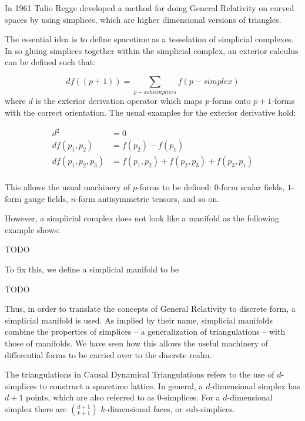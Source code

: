 \documentclass[12pt]{article}
\begin{document}
In 1961 Tulio Regge developed a method for doing General Relativity on curved spaces by using simplices, which are higher dimensional versions of triangles. \cite{regge}

The essential idea is to define spacetime as a tesselation of simplicial complexes. In so gluing simplices together within the simplicial complex, an exterior calculus can be defined such that: \cite{david_simplicial_1993}

\begin{equation}
df((p+1))=\sum_{p-subsimplices}f(p-simplex)
\end{equation}
where $d$ is the exterior derivation operator which maps $p$-forms onto $p+1$-forms with the correct orientation. The usual examples for the exterior derivative hold:

\begin{equation}
\begin{aligned}
d^2&=0\\
df(p_1,p_2)&=f(p_2)-f(p_1)\\
df(p_1,p_2,p_3)&=f(p_1,p_2)+f(p_2,p_3)+f(p_3,p_1)\\
\end{aligned}
\end{equation}

This allows the usual machinery of $p$-forms to be defined: $0$-form scalar fields, $1$-form gauge fields, $n$-form antisymmetric tensors, and so on.

However, a simplicial complex does not look like a manifold as the following example shows:

TODO

To fix this, we define a simplicial manifold to be

TODO

Thus, in order to translate the concepts of General Relativity to discrete form, a simplicial manifold is used. As implied by their name, simplicial manifolds combine the properties of simplices -- a generalization of triangulations -- with those of manifolds. We have seen how this allows the useful machinery of differential forms to be carried over to the discrete realm.

The triangulations in Causal Dynamical Triangulations refers to the use of $d$-simplices to construct a spacetime lattice. In general, a $d$-dimensional simplex has $d+1$ points, which are also referred to as $0$-simplices. For a $d$-dimensional simplex there are $\binom{d+1}{k+1}$ $k$-dimensional faces, or sub-simplices.
\end{document}
